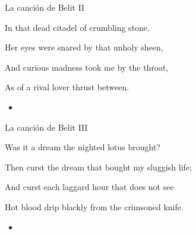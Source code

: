 \begin{frame}{La canción de Belit II}
	\begin{exampleblock}{}
		In that dead citadel of crumbling stone.

		Her eyes were snared by that unholy sheen,

		And curious madness took me by the throat,

		As of a rival lover thrust between.
	\end{exampleblock}

	\begin{itemize}
		\item \textit{  }
	\end{itemize}
\end{frame}
\note[itemize]{
	\item
}

\begin{frame}{La canción de Belit III}
	\begin{exampleblock}{}
		Was it a dream the nighted lotus brought?

		Then curst the dream that bought my sluggish life;

		And curst each laggard hour that does not see

		Hot blood drip blackly from the crimsoned knife.
	\end{exampleblock}

	\begin{itemize}
		\item \textit{  }
	\end{itemize}
\end{frame}
\note[itemize]{
	\item
}

